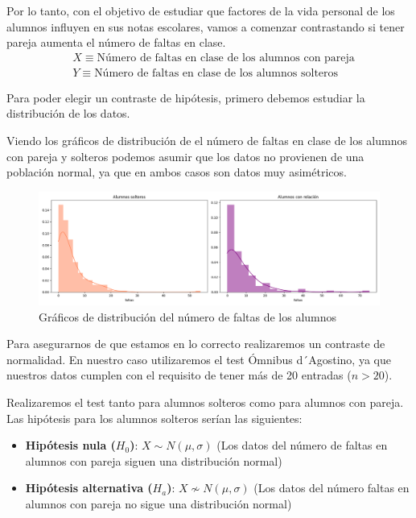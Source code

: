 Por lo tanto, con el objetivo de estudiar que factores de la vida personal de los alumnos influyen en sus notas escolares, vamos a comenzar contrastando si tener pareja aumenta el número de faltas en clase.
\begin{equation*}
    \begin{split}
        & X \equiv \text{Número de faltas en clase de los alumnos con pareja}\\
        & Y \equiv \text{Número de faltas en clase de los alumnos solteros}
    \end{split} 
\end{equation*}

\pagebreak

Para poder elegir un contraste de hipótesis, primero debemos estudiar la distribución de los datos.

Viendo los gráficos de distribución de el número de faltas en clase de los alumnos con pareja y solteros podemos asumir que los datos no provienen de una población normal, ya que en ambos casos son datos muy asimétricos.

\begin{figure}[H]
    \centering
    \includegraphics[width=1\textwidth]{./figures/distribucion-numero-faltas.png}
    \caption{Gráficos de distribución del número de faltas de los alumnos}
    \label{fig:dist-num-faltas}
\end{figure}

Para asegurarnos de que estamos en lo correcto realizaremos un contraste de normalidad. En nuestro caso utilizaremos el test Ómnibus d´Agostino, ya que nuestros datos cumplen con el requisito de tener más de 20 entradas ($n>20$).

Realizaremos el test tanto para alumnos solteros como para alumnos con pareja. Las hipótesis para los alumnos solteros serían las siguientes:

\begin{itemize}
    \item \textbf{Hipótesis nula ($H_0$)}: $X \sim N(\mu, \sigma)$ (Los datos del número de faltas en alumnos con pareja siguen una distribución normal)
    \item \textbf{Hipótesis alternativa ($H_a$)}: $X \not \sim N(\mu, \sigma)$ (Los datos del número faltas en alumnos con pareja no sigue una distribución normal)
\end{itemize}

